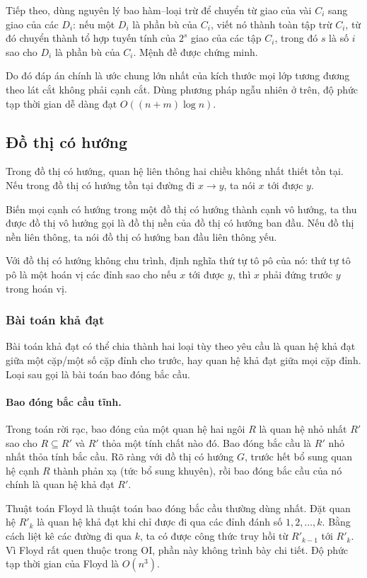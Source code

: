 \documentclass[11pt]{article}
\renewcommand{\leadsto}{\mathrel{\longrightarrow}}
\begin{document}
Tiếp theo, dùng nguyên lý bao hàm--loại trừ để chuyển từ giao của vài $C_i$ sang
giao của các $D_i$: nếu một $D_i$ là phần bù của $C_i$, viết nó thành toàn tập
trừ $C_i$, từ đó chuyển thành tổ hợp tuyến tính của $2^s$ giao của các tập
$C_i$, trong đó $s$ là số $i$ sao cho $D_i$ là phần bù của $C_i$. Mệnh đề được
chứng minh.

Do đó đáp án chính là ước chung lớn nhất của kích thước mọi lớp tương đương theo
lát cắt không phải cạnh cắt. Dùng phương pháp ngẫu nhiên ở trên, độ phức tạp
thời gian dễ dàng đạt $O((n+m)\log n)$.

\subsection{Đồ thị có hướng}

Trong đồ thị có hướng, quan hệ liên thông hai chiều không nhất thiết tồn tại.
Nếu trong đồ thị có hướng tồn tại đường đi $x\leadsto y$, ta nói $x$ tới được
$y$.

Biến mọi cạnh có hướng trong một đồ thị có hướng thành cạnh vô hướng, ta thu
được đồ thị vô hướng gọi là đồ thị nền của đồ thị có hướng ban đầu. Nếu đồ thị
nền liên thông, ta nói đồ thị có hướng ban đầu liên thông yếu.

Với đồ thị có hướng không chu trình, định nghĩa thứ tự tô pô của nó: thứ tự tô
pô là một hoán vị các đỉnh sao cho nếu $x$ tới được $y$, thì $x$ phải đứng trước
$y$ trong hoán vị.

\subsubsection{Bài toán khả đạt}

Bài toán khả đạt có thể chia thành hai loại tùy theo yêu cầu là quan hệ khả đạt
giữa một cặp/một số cặp đỉnh cho trước, hay quan hệ khả đạt giữa mọi cặp đỉnh.
Loại sau gọi là bài toán bao đóng bắc cầu.

\paragraph{Bao đóng bắc cầu tĩnh.}
Trong toán rời rạc, bao đóng của một quan hệ hai ngôi $R$ là quan hệ nhỏ nhất
$R'$ sao cho $R\subseteq R'$ và $R'$ thỏa một tính chất nào đó. Bao đóng bắc
cầu là $R'$ nhỏ nhất thỏa tính bắc cầu. Rõ ràng với đồ thị có hướng $G$, trước
hết bổ sung quan hệ cạnh $R$ thành phản xạ (tức bổ sung khuyên), rồi bao đóng
bắc cầu của nó chính là quan hệ khả đạt $R'$.

Thuật toán Floyd là thuật toán bao đóng bắc cầu thường dùng nhất. Đặt quan hệ
$R'_k$ là quan hệ khả đạt khi chỉ được đi qua các đỉnh đánh số
$1,2,\ldots,k$. Bằng cách liệt kê các đường đi qua $k$, ta có được công thức
truy hồi từ $R'_{k-1}$ tới $R'_k$. Vì Floyd rất quen thuộc trong OI, phần này
không trình bày chi tiết. Độ phức tạp thời gian của Floyd là $O(n^3)$.
\end{document}
